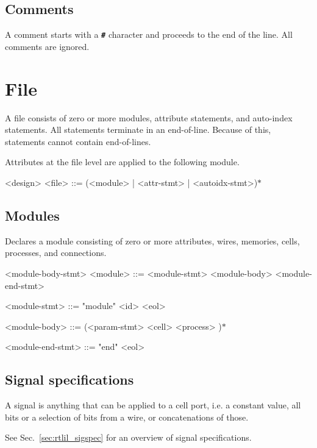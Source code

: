 \subsection{Comments}

A comment starts with a \texttt{\textbf{\#}} character and proceeds to the end of the line. All comments are ignored.

\section{File}

A file consists of zero or more modules, attribute statements, and auto-index statements. All statements terminate in an end-of-line. Because of this, statements cannot contain end-of-lines.

Attributes at the file level are applied to the following module.

\begin{indentgrammar}{<design>}
<file> ::= (<module> | <attr-stmt> | <autoidx-stmt>)$*$
\end{indentgrammar}

\subsection{Modules}

Declares a module consisting of zero or more attributes, wires, memories, cells, processes, and connections.

\begin{indentgrammar}{<module-body-stmt>}
<module> ::= <module-stmt> <module-body> <module-end-stmt>

<module-stmt> ::= "module" <id> <eol>

<module-body> ::= 
(<param-stmt>
  \alt <cell>
  \alt <process>
  )$*$
\end{indentgrammar}

<module-end-stmt> ::= "end" <eol>

\subsection{Signal specifications}

A signal is anything that can be applied to a cell port, i.e. a constant value, all bits or a selection of bits from a wire, or concatenations of those.

See Sec.~\ref{sec:rtlil_sigspec} for an overview of signal specifications.

